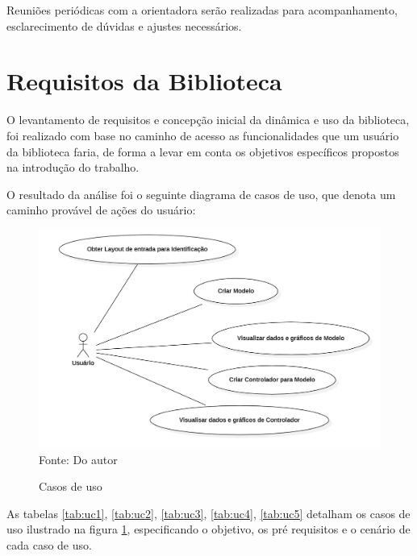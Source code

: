 Reuniões periódicas com a orientadora serão realizadas para acompanhamento, esclarecimento de dúvidas e ajustes
necessários.

\section{Requisitos da Biblioteca}

O levantamento de requisitos e concepção inicial da dinâmica e uso da biblioteca, foi realizado com base no caminho de
acesso as funcionalidades que um usuário da biblioteca faria, de forma a levar em conta os objetivos específicos
propostos na introdução do trabalho.

O resultado da análise foi o seguinte diagrama de casos de uso, que denota um caminho provável de ações do usuário:

\begin{figure}[H]
    \centering
    \caption{Casos de uso}
    \includegraphics[scale=0.5]{figuras/use_cases}
    \label{fig:use_cases}
    \\
    \vspace{0cm}\hspace{0cm}\small{Fonte: Do autor}
\end{figure}

As tabelas \ref{tab:uc1}, \ref{tab:uc2}, \ref{tab:uc3}, \ref{tab:uc4}, \ref{tab:uc5} detalham os casos de uso ilustrado
na figura \ref{fig:use_cases}, especificando o objetivo, os pré requisitos e o cenário de cada caso de uso.


